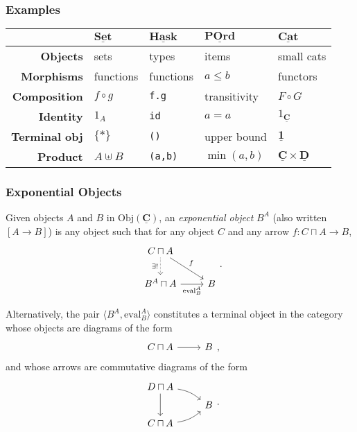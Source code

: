 \documentclass[10pt]{beamer}
\newcommand{\Cat}[1]{\ensuremath{\underline{\mathbf{#1}}}}
\newcommand{\Obj}[1]{\ensuremath{\mathrm{Obj}(\Cat{#1})}}
\theoremstyle{definition}
\theoremstyle{remark}
\numberwithin{equation}{section}
\begin{document}
\begin{frame}[fragile]
  \frametitle{Examples}

  \begin{center}
    \begin{tabular}{r l l l l}\toprule
    & $\Cat{Set}$ & $\Cat{Hask}$ & $\Cat{POrd}$ & $\Cat{Cat}$ \\\midrule
    \textbf{Objects} & sets & types & items & small cats \\
    \textbf{Morphisms} & functions & functions & $a \leq b$ & functors \\
    \textbf{Composition} & $f \circ g$ & \lstinline!f.g! & transitivity & $F \circ G$ \\
    \textbf{Identity} & $1_A$ & {\lstinline!id!} & $a = a$ & $1_{\Cat{C}}$ \\
    \textbf{Terminal obj\rlap{.}} & $\{*\}$ & \lstinline!()! & upper bound & $\Cat{1}$ \\
    \textbf{Product} & $A \uplus B$ & \lstinline!(a,b)! & $\min(a,b)$ & $\Cat{C} \times \Cat{D}$ \\
  \end{tabular}
  \end{center}
\end{frame}

\begin{frame}[fragile]
  \frametitle{Exponential Objects}

  Given objects $A$ and $B$ in $\Obj{C}$, an \emph{exponential object} $B^A$
  (also written $[A \rightarrow B]$) is any object such that for any object $C$ and any
  arrow $f\colon C \sqcap A \rightarrow B$,
  \[
  \begin{tikzcd}
    C \sqcap A \arrow[swap,densely dotted]{d}{\exists!} \arrow{dr}{f} & \\
    B^A \sqcap A \arrow[swap]{r}{\mathrm{eval}_B^A} & B
    \end{tikzcd}\rlap{.}
  \]
  
  
  Alternatively, the pair $\langle {B^A,\mathrm{eval}_B^A} \rangle$ constitutes a terminal
  object in the category whose objects are diagrams of the form
  \[
  \begin{tikzcd}
    C \sqcap A \arrow{r} & B
  \end{tikzcd}\rlap{,}
  \]
  and whose arrows are commutative diagrams of the form
  \[
  \begin{tikzcd}[row sep=tiny]
    D \sqcap A \arrow{dd} \arrow[bend left=15]{dr} & \\
    & B \\
    C \sqcap A \arrow[bend right=15]{ur} &
  \end{tikzcd}\rlap{.}
  \]
\end{frame}
\end{document}
